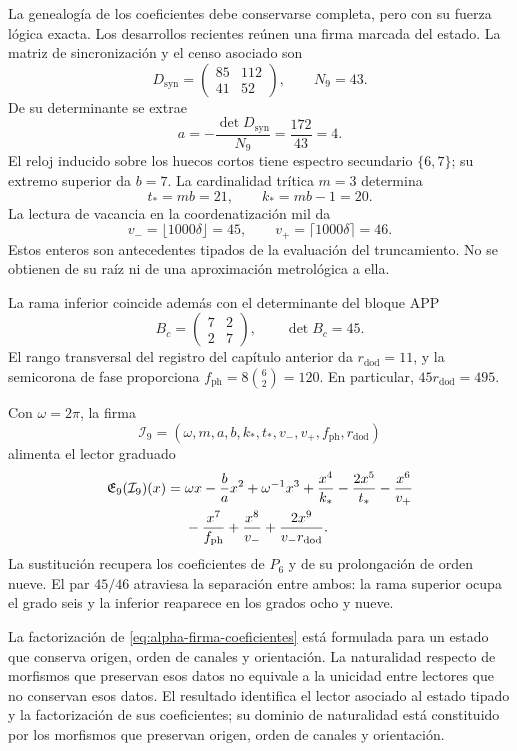 La genealogía de los coeficientes debe conservarse completa, pero con su
fuerza lógica exacta. Los desarrollos recientes reúnen una firma marcada
del estado. La matriz de sincronización y el censo asociado son
\[
 D_{\mathrm{syn}}=\begin{pmatrix}85&112\\41&52\end{pmatrix},
 \qquad N_9=43.
\]
De su determinante se extrae
\[
 a=-\frac{\det D_{\mathrm{syn}}}{N_9}
   =\frac{172}{43}=4.
\]
El reloj inducido sobre los huecos cortos tiene espectro secundario
\(\{6,7\}\); su extremo superior da \(b=7\). La cardinalidad
trítica \(m=3\) determina
\[
 t_*=mb=21,\qquad k_*=mb-1=20.
\]
La lectura de vacancia en la coordenatización mil da
\[
 v_-=\lfloor1000\delta\rfloor=45,\qquad
 v_+=\lceil1000\delta\rceil=46.
\]
Estos enteros son antecedentes tipados de la evaluación del truncamiento. No se
obtienen de su raíz ni de una aproximación metrológica a ella.

La rama inferior coincide además con el determinante del bloque APP
\[
 B_c=\begin{pmatrix}7&2\\2&7\end{pmatrix},\qquad\det B_c=45.
\]
El rango transversal del registro del capítulo anterior da
\(r_{\mathrm{dod}}=11\), y la semicorona de fase proporciona
\(f_{\mathrm{ph}}=8\binom62=120\). En particular,
\(45r_{\mathrm{dod}}=495\).

Con \(\omega=2\pi\), la firma
\[
 \mathcal I_9=(\omega,m,a,b,k_*,t_*,v_-,v_+,f_{\mathrm{ph}},r_{\mathrm{dod}})
\]
alimenta el lector graduado
\begin{align}
 \mathfrak E_9(\mathcal I_9)(x)
 ={}&\omega x-\frac ba x^2+\omega^{-1}x^3
 +\frac{x^4}{k_*}-\frac{2x^5}{t_*}-\frac{x^6}{v_+}\notag\\
 &-\frac{x^7}{f_{\mathrm{ph}}}+\frac{x^8}{v_-}
 +\frac{2x^9}{v_-r_{\mathrm{dod}}}.
 \label{eq:alpha-firma-coeficientes}
\end{align}
La sustitución recupera los coeficientes de \(P_6\) y de su
prolongación de orden nueve. El par \(45/46\) atraviesa la separación
entre ambos: la rama superior ocupa el grado seis y la inferior reaparece
en los grados ocho y nueve.

La factorización de \eqref{eq:alpha-firma-coeficientes} está formulada
para un estado que conserva origen, orden de canales y orientación. La
naturalidad respecto de morfismos que preservan esos datos no equivale a
la unicidad entre lectores que no conservan esos datos. El resultado
identifica el lector asociado al estado tipado y la factorización de sus
coeficientes; su dominio de naturalidad está constituido por los morfismos
que preservan origen, orden de canales y orientación.

